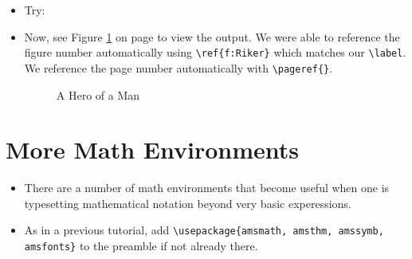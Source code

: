 \begin{itemize}
\item Try: \\

\item Now, see Figure \ref{f:Riker} on page \pageref{f:Riker} to view
  the output. We were able to reference the figure number
  automatically using \verb!\ref{f:Riker}! which matches our
  \verb!\label!. We reference the page number automatically with \verb!\pageref{}!.
  \\

\begin{figure}
  \begin{center}
    \caption{A Hero of a Man} \label{f:Riker}
  \end{center}
\end{figure}

\end{itemize}

\section*{More Math Environments}
\begin{itemize} 
\item There are a number of math environments that become useful when
  one is typesetting mathematical notation beyond very basic
  experessions.
\item As in a previous tutorial, add
  \verb!\usepackage{amsmath, amsthm, amssymb, amsfonts}! to the
  preamble if not already there.
\end{itemize}

